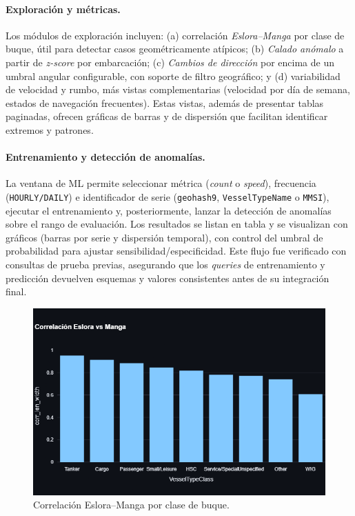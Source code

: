 \documentclass[10pt]{article}
\begin{document}
\paragraph{Exploración y métricas.}
Los módulos de exploración incluyen: (a) correlación \emph{Eslora–Manga} por clase de buque, útil para detectar casos geométricamente atípicos; (b) \emph{Calado anómalo} a partir de \textit{z-score} por embarcación; (c) \emph{Cambios de dirección} por encima de un umbral angular configurable, con soporte de filtro geográfico; y (d) variabilidad de velocidad y rumbo, más vistas complementarias (velocidad por día de semana, estados de navegación frecuentes). Estas vistas, además de presentar tablas paginadas, ofrecen gráficas de barras y de dispersión que facilitan identificar extremos y patrones.

\paragraph{Entrenamiento y detección de anomalías.}
La ventana de ML permite seleccionar métrica (\textit{count} o \textit{speed}), frecuencia (\texttt{HOURLY/DAILY}) e identificador de serie (\texttt{geohash9}, \texttt{VesselTypeName} o \texttt{MMSI}), ejecutar el entrenamiento y, posteriormente, lanzar la detección de anomalías sobre el rango de evaluación. Los resultados se listan en tabla y se visualizan con gráficos (barras por serie y dispersión temporal), con control del umbral de probabilidad para ajustar sensibilidad/especificidad. Este flujo fue verificado con consultas de prueba previas, asegurando que los \textit{queries} de entrenamiento y predicción devuelven esquemas y valores consistentes antes de su integración final.

\begin{figure}[H]
  \centering
  \includegraphics[width=0.6\linewidth]{figures/EsloraManga.png}
  \caption{Correlación Eslora–Manga por clase de buque.}
  \label{fig:eslora-manga}
\end{figure}
\end{document}
